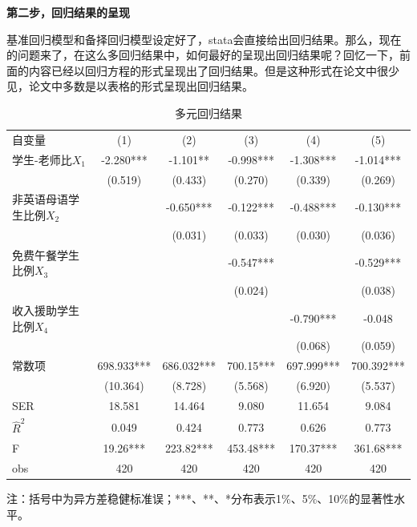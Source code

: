 \documentclass[cn,12pt,math=newtx,citestyle=gb7714-2015,bibstyle=gb7714-2015]{elegantbook}
\begin{document}
	\textbf{第二步，回归结果的呈现}
	
	基准回归模型和备择回归模型设定好了，stata会直接给出回归结果。那么，现在的问题来了，在这么多回归结果中，如何最好的呈现出回归结果呢？回忆一下，前面的内容已经以回归方程的形式呈现出了回归结果。但是这种形式在论文中很少见，论文中多数是以表格的形式呈现出回归结果。
	
	\begin{center}
		\begin{table}[!h]
			\caption{多元回归结果}\label{tab:digit}
			\begin{center}
				\begin{tabular}{lccccc}
					\hline
					自变量&(1)&(2)&(3)&(4)&(5)\\
					\cline{1-6}
					学生-老师比$X_1$&-2.280***&-1.101**&-0.998***&-1.308***&-1.014***\\
					&(0.519)&(0.433)&(0.270)&(0.339)&(0.269)\\
					
					非英语母语学生比例$X_2$&&-0.650***&-0.122***&-0.488***&-0.130***\\
					&&(0.031)&(0.033)&(0.030)&(0.036)\\
					
					免费午餐学生比例$X_3$&&&-0.547***&&-0.529***\\
					&&&(0.024)&&(0.038)\\
					
					收入援助学生比例$X_4$&&&&-0.790***&-0.048\\
					&&&&(0.068)&(0.059)\\
					
					常数项&698.933***&686.032***&700.15***&697.999***&700.392***\\
					&(10.364)&(8.728)&(5.568)&(6.920)&(5.537)\\
					\cline{1-6}
					SER&18.581&14.464&9.080&11.654&9.084\\
					
					$\hat{R}^2$&0.049&0.424&0.773&0.626&0.773\\
					
					F&19.26***&223.82***&453.48***&170.37***&361.68***\\
					
					obs&420&420&420&420&420\\
					\hline
				\end{tabular}
			\end{center}
		\end{table}
	\end{center}
	注：括号中为异方差稳健标准误；***、**、*分布表示1\%、5\%、10\%的显著性水平。
	
\end{document}
